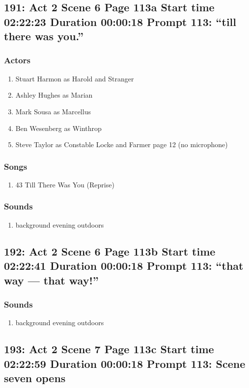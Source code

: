 \subsection{191: Act 2 Scene 6 Page 113a Start time 02:22:23 Duration 00:00:18 Prompt 113: ``till there was you.''}

\subsubsection{Actors}
\begin{enumerate}
\item Stuart Harmon as Harold and Stranger
\item Ashley Hughes as Marian
\item Mark Sousa as Marcellus
\item Ben Wesenberg as Winthrop
\item Steve Taylor as Constable Locke and Farmer page 12 (no microphone)
\end{enumerate}

\subsubsection{Songs}
\begin{enumerate}
\item 43 Till There Was You (Reprise)
\end{enumerate}\subsubsection{Sounds}
\begin{enumerate}
\item background evening outdoors
\end{enumerate}
\subsection{192: Act 2 Scene 6 Page 113b Start time 02:22:41 Duration 00:00:18 Prompt 113: ``that way --- that way!''}
\subsubsection{Sounds}
\begin{enumerate}
\item background evening outdoors
\end{enumerate}
\subsection{193: Act 2 Scene 7 Page 113c Start time 02:22:59 Duration 00:00:18 Prompt 113: Scene seven opens}

